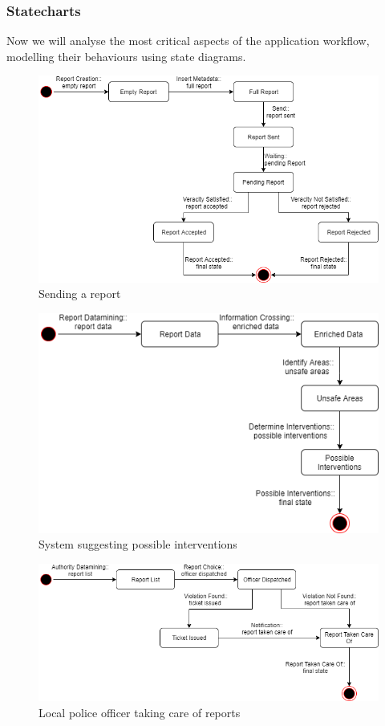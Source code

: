 \subsubsection{Statecharts}
Now we will analyse the most critical aspects of the application workflow, modelling their behaviours using state diagrams.
\begin{figure}[H]
	\centering
	\includegraphics[width=\textwidth]{Images/ReportChart.png}
	\caption{\label{fig:metamodel2}Sending a report}
\end{figure}
\begin{figure}[H]
	\centering
	\includegraphics[scale=0.7]{Images/InterventionChart.png}
	\caption{\label{fig:metamodel2}System suggesting possible interventions}
\end{figure}
\begin{figure}[H]
	\centering
	\includegraphics[width=\textwidth]{Images/PoliceChart.png}
	\caption{\label{fig:metamodel2}Local police officer taking care of reports}
\end{figure}

